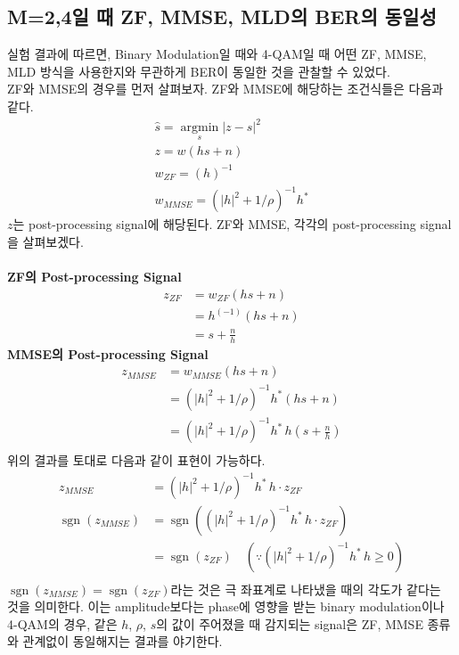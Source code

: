 \documentclass{article}
\newcommand{\bd}{\textbf} %
\providecommand{\abs}[1]{\lvert#1\rvert}
\newcommand{\sgn}{\operatorname{sgn}}
\begin{document}
\subsection{M=2,4일 때 ZF, MMSE, MLD의 BER의 동일성}
실험 결과에 따르면, Binary Modulation일 때와 4-QAM일 때 어떤 ZF, MMSE, MLD 방식을 사용한지와 무관하게 BER이 동일한 것을 관찰할 수 있었다.\\
ZF와 MMSE의 경우를 먼저 살펴보자. ZF와 MMSE에 해당하는 조건식들은 다음과 같다.
\begin{gather}
\hat{s}=\operatorname*{argmin}_s \abs{z-s}^2\\
z=w(hs+n)\\
w_{ZF}=(h)^{-1}\\
w_{MMSE}=(\abs{h}^2+1/\rho)^{-1}h^*
\end{gather}
$z$는 post-processing signal에 해당된다. ZF와 MMSE, 각각의 post-processing signal을 살펴보겠다.\\
\\
\bd{ZF의 Post-processing Signal}
\begin{equation}
\begin{split}
z_{ZF}&=w_{ZF}(hs+n)\\
&=h^(-1)(hs+n)\\
&=s+\frac{n}{h}
\end{split}
\end{equation}
\bd{MMSE의 Post-processing Signal}
\begin{equation}
\begin{split}
z_{MMSE}&=w_{MMSE}(hs+n)\\
&=(\abs{h}^2+1/\rho)^{-1}h^*(hs+n)\\
&=(\abs{h}^2+1/\rho)^{-1}h^*\, h(s+\frac{n}{h})\\
\end{split}
\end{equation}
위의 결과를 토대로 다음과 같이 표현이 가능하다.
\begin{equation}
\begin{split}
z_{MMSE}&=(\abs{h}^2+1/\rho)^{-1}h^*\,h\cdot z_{ZF}\\
\sgn(z_{MMSE}) &= \sgn((\abs{h}^2+1/\rho)^{-1}h^*\,h\cdot z_{ZF})\\
&=\sgn(z_{ZF})\quad (\because (\abs{h}^2+1/\rho)^{-1}h^*\,h \geq 0) \\
\end{split}
\end{equation}
$\sgn(z_{MMSE})=\sgn(z_{ZF})$라는 것은 극 좌표계로 나타냈을 때의 각도가 같다는 것을 의미한다. 이는 amplitude보다는 phase에 영향을 받는 binary modulation이나 4-QAM의 경우, 같은 $h$, $\rho$, $s$의 값이 주어졌을 때 감지되는 signal은 ZF, MMSE 종류와 관계없이 동일해지는 결과를 야기한다.\\
\end{document}
